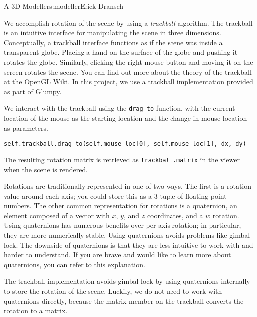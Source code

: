 \begin{aosachapter}{A 3D Modeller}{s:modeller}{Erick Dransch}
\label{rotating-the-scene-with-a-trackball}

We accomplish rotation of the scene by using a \emph{trackball}
algorithm. The trackball is an intuitive interface for manipulating the
scene in three dimensions. Conceptually, a trackball interface functions
as if the scene was inside a transparent globe. Placing a hand on the
surface of the globe and pushing it rotates the globe. Similarly,
clicking the right mouse button and moving it on the screen rotates the
scene. You can find out more about the theory of the trackball at the
\href{http://www.opengl.org/wiki/Object_Mouse_Trackball}{OpenGL Wiki}.
In this project, we use a trackball implementation provided as part of
\href{https://code.google.com/p/glumpy/source/browse/glumpy/trackball.py}{Glumpy}.

We interact with the trackball using the \texttt{drag\_to} function,
with the current location of the mouse as the starting location and the
change in mouse location as parameters.

\begin{verbatim}
self.trackball.drag_to(self.mouse_loc[0], self.mouse_loc[1], dx, dy)
\end{verbatim}

The resulting rotation matrix is retrieved as \texttt{trackball.matrix}
in the viewer when the scene is rendered.

\label{aside-quaternions}

Rotations are traditionally represented in one of two ways. The first is
a rotation value around each axis; you could store this as a 3-tuple of
floating point numbers. The other common representation for rotations is
a quaternion, an element composed of a vector with $x$, $y$, and $z$
coordinates, and a $w$ rotation. Using quaternions has numerous benefits
over per-axis rotation; in particular, they are more numerically stable.
Using quaternions avoids problems like gimbal lock. The downside of
quaternions is that they are less intuitive to work with and harder to
understand. If you are brave and would like to learn more about
quaternions, you can refer to \href{http://3dgep.com/?p=1815}{this
explanation}.

The trackball implementation avoids gimbal lock by using quaternions
internally to store the rotation of the scene. Luckily, we do not need
to work with quaternions directly, because the matrix member on the
trackball converts the rotation to a matrix.


\end{aosachapter}
